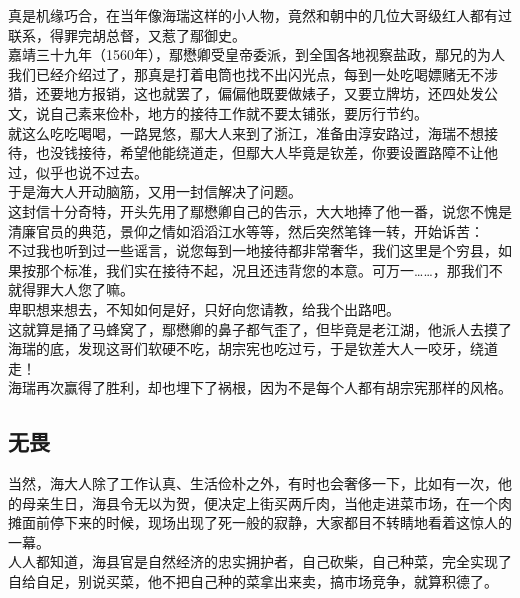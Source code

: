 \begin{multicols}{\theparacolNo}
真是机缘巧合，在当年像海瑞这样的小人物，竟然和朝中的几位大哥级红人都有过联系，得罪完胡总督，又惹了鄢御史。\\

嘉靖三十九年（1560年），鄢懋卿受皇帝委派，到全国各地视察盐政，鄢兄的为人我们已经介绍过了，那真是打着电筒也找不出闪光点，每到一处吃喝嫖赌无不涉猎，还要地方报销，这也就罢了，偏偏他既要做婊子，又要立牌坊，还四处发公文，说自己素来俭朴，地方的接待工作就不要太铺张，要厉行节约。\\

就这么吃吃喝喝，一路晃悠，鄢大人来到了浙江，准备由淳安路过，海瑞不想接待，也没钱接待，希望他能绕道走，但鄢大人毕竟是钦差，你要设置路障不让他过，似乎也说不过去。\\

于是海大人开动脑筋，又用一封信解决了问题。\\

这封信十分奇特，开头先用了鄢懋卿自己的告示，大大地捧了他一番，说您不愧是清廉官员的典范，景仰之情如滔滔江水等等，然后突然笔锋一转，开始诉苦：\\

不过我也听到过一些谣言，说您每到一地接待都非常奢华，我们这里是个穷县，如果按那个标准，我们实在接待不起，况且还违背您的本意。可万一……，那我们不就得罪大人您了嘛。\\

卑职想来想去，不知如何是好，只好向您请教，给我个出路吧。\\

这就算是捅了马蜂窝了，鄢懋卿的鼻子都气歪了，但毕竟是老江湖，他派人去摸了海瑞的底，发现这哥们软硬不吃，胡宗宪也吃过亏，于是钦差大人一咬牙，绕道走！\\

海瑞再次赢得了胜利，却也埋下了祸根，因为不是每个人都有胡宗宪那样的风格。\\

\subsection{无畏}
当然，海大人除了工作认真、生活俭朴之外，有时也会奢侈一下，比如有一次，他的母亲生日，海县令无以为贺，便决定上街买两斤肉，当他走进菜市场，在一个肉摊面前停下来的时候，现场出现了死一般的寂静，大家都目不转睛地看着这惊人的一幕。\\

人人都知道，海县官是自然经济的忠实拥护者，自己砍柴，自己种菜，完全实现了自给自足，别说买菜，他不把自己种的菜拿出来卖，搞市场竞争，就算积德了。\\


\end{multicols}
